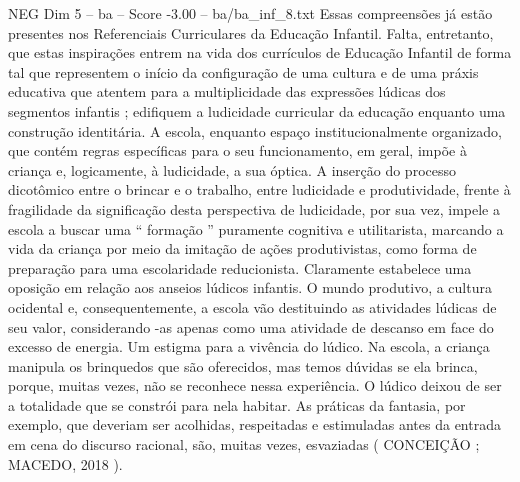 \begin{textsample}{NEG Dim 5 – ba – Score -3.00 – ba/ba\_inf\_8.txt}
Essas compreensões já estão presentes nos Referenciais Curriculares da Educação Infantil.
Falta, entretanto, que estas inspirações entrem na vida dos currículos de Educação Infantil de forma tal que representem o início da configuração de uma cultura e de uma práxis educativa que atentem para a multiplicidade das expressões lúdicas dos segmentos infantis ; edifiquem a ludicidade curricular da educação enquanto uma construção identitária.
A escola, enquanto espaço institucionalmente organizado, que contém regras específicas para o seu funcionamento, em geral, impõe à criança e, logicamente, à ludicidade, a sua óptica.
A inserção do processo dicotômico entre o brincar e o trabalho, entre ludicidade e produtividade, frente à fragilidade da significação desta perspectiva de ludicidade, por sua vez, impele a escola a buscar uma “ formação ” puramente cognitiva e utilitarista, marcando a vida da criança por meio da imitação de ações produtivistas, como forma de preparação para uma escolaridade reducionista.
Claramente estabelece uma oposição em relação aos anseios lúdicos infantis.
O mundo produtivo, a cultura ocidental e, consequentemente, a escola vão destituindo as atividades lúdicas de seu valor, considerando -as apenas como uma atividade de descanso em face do excesso de energia.
Um estigma para a vivência do lúdico.
Na escola, a criança manipula os brinquedos que são oferecidos, mas temos dúvidas se ela brinca, porque, muitas vezes, não se reconhece nessa experiência.
O lúdico deixou de ser a totalidade que se constrói para nela habitar.
As práticas da fantasia, por exemplo, que deveriam ser acolhidas, respeitadas e estimuladas antes da entrada em cena do discurso racional, são, muitas vezes, esvaziadas ( CONCEIÇÃO ; MACEDO, 2018 ).

\end{textsample}
